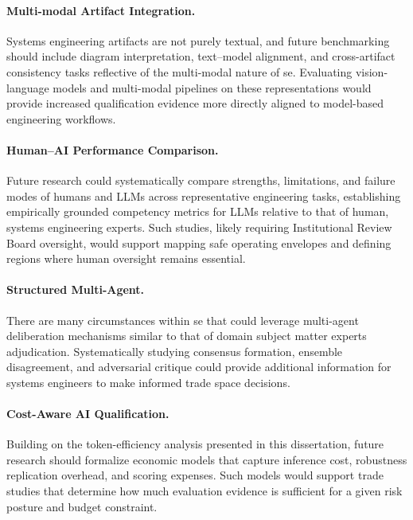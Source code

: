\paragraph{Multi-modal Artifact Integration.}
Systems engineering artifacts are not purely textual, and future benchmarking should include diagram interpretation, text–model alignment, and cross-artifact consistency tasks reflective of the multi-modal nature of \ac{se}. Evaluating vision-language models and multi-modal pipelines on these representations would provide increased qualification evidence more directly aligned to model-based engineering workflows.

\paragraph{Human–AI Performance Comparison.}
Future research could systematically compare strengths, limitations, and failure modes of humans and LLMs across representative engineering tasks, establishing empirically grounded competency metrics for LLMs relative to that of human, systems engineering experts. Such studies, likely requiring Institutional Review Board oversight, would support mapping safe operating envelopes and defining regions where human oversight remains essential.

\paragraph{Structured Multi-Agent.}
There are many circumstances within \ac{se} that could leverage multi-agent deliberation mechanisms similar to that of domain subject matter experts adjudication. Systematically studying consensus formation, ensemble disagreement, and adversarial critique could provide additional information for systems engineers to make informed trade space decisions.

\paragraph{Cost-Aware AI Qualification.}
Building on the token-efficiency analysis presented in this dissertation, future research should formalize economic models that capture inference cost, robustness replication overhead, and scoring expenses. Such models would support trade studies that determine how much evaluation evidence is sufficient for a given risk posture and budget constraint.

